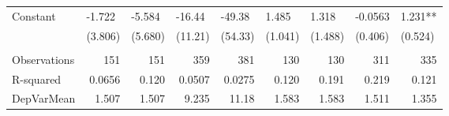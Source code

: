 \begin{tabular}{lrrrrrrrr}
Constant & \multicolumn{1}{l}{-1.722} & \multicolumn{1}{l}{-5.584} & \multicolumn{1}{l}{-16.44} & \multicolumn{1}{l}{-49.38} & \multicolumn{1}{l}{1.485} & \multicolumn{1}{l}{1.318} & \multicolumn{1}{l}{-0.0563} & \multicolumn{1}{l}{1.231**} \\
      & \multicolumn{1}{l}{(3.806)} & \multicolumn{1}{l}{(5.680)} & \multicolumn{1}{l}{(11.21)} & \multicolumn{1}{l}{(54.33)} & \multicolumn{1}{l}{(1.041)} & \multicolumn{1}{l}{(1.488)} & \multicolumn{1}{l}{(0.406)} & \multicolumn{1}{l}{(0.524)} \\
      &       &       &       &       &       &       &       &  \\
      \midrule
Observations & 151   & 151   & 359   & 381   & 130   & 130   & 311   & 335 \\
R-squared & 0.0656 & 0.120 & 0.0507 & 0.0275 & 0.120 & 0.191 & 0.219 & 0.121 \\
DepVarMean & 1.507 & 1.507 & 9.235 & 11.18 & 1.583 & 1.583 & 1.511 & 1.355 \\
\bottomrule
\bottomrule
\end{tabular}%
